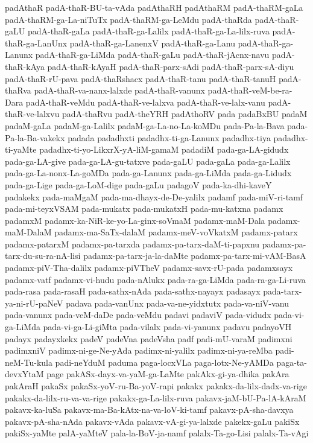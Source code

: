 {padAthaR
padA-thaR-BU-ta-vAda
padAthaRH
padAthaRM
padA-thaRM-gaLa
padA-thaRM-ga-La-niTuTx
padA-thaRM-ga-LeMdu
padA-thaRda
padA-thaR-gaLU
padA-thaR-gaLa
padA-thaR-ga-Lalilx
padA-thaR-ga-La-lilx-ruva
padA-thaR-ga-LanUnx
padA-thaR-ga-LanenxV
padA-thaR-ga-Lanu
padA-thaR-ga-Lanunx
padA-thaR-ga-LiMda
padA-thaR-gaLu
padA-thaR-jAcnx-navu
padA-thaR-kAya
padA-thaR-kAyaH
padA-thaR-parx-sAdi
padA-thaR-parx-sA-diyu
padA-thaR-rU-pava
padA-thaRshacx
padA-thaR-tanu
padA-thaR-tanuH
padA-thaRva
padA-thaR-va-nanx-lalxde
padA-thaR-vanunx
padA-thaR-veM-be-ra-Dara
padA-thaR-veMdu
padA-thaR-ve-lalxva
padA-thaR-ve-lalx-vanu
padA-thaR-ve-lalxvu
padA-thaRvu
padA-theYRH
padAthoRV
pada
padaBxBU
padaM
padaM-gaLa
padaM-ga-Lalilx
padaM-ga-La-no-La-koMDu
pada-Pa-la-Bava
pada-Pa-la-Ba-vakekx
padada
padadhxti
padadhx-ti-ga-Lanunx
padadhx-tiya
padadhx-ti-yaMte
padadhx-ti-yo-LikxrX-yA-liM-gamaM
padadiM
pada-ga-LA-gidudx
pada-ga-LA-give
pada-ga-LA-gu-tatxve
pada-gaLU
pada-gaLa
pada-ga-Lalilx
pada-ga-La-nonx-La-goMDa
pada-ga-Lanunx
pada-ga-LiMda
pada-ga-Lidudx
pada-ga-Lige
pada-ga-LoM-dige
pada-gaLu
padagoV
pada-ka-dhi-kaveY
padakekx
pada-maMgaM
pada-ma-dhayx-de-De-yalilx
padamf
pada-miV-ri-tamf
pada-mi-teyxVSAM
pada-mukatx
pada-mukatxH
pada-mu-katxna
padamx
padamxM
padamx-ka-NiR-ke-yo-La-ginx-soVmaM
padamx-maM-Dala
padamx-maM-DalaM
padamx-ma-SaTx-dalaM
padamx-meV-voVkatxM
padamx-patarx
padamx-patarxM
padamx-pa-tarxda
padamx-pa-tarx-daM-ti-papxnu
padamx-pa-tarx-du-su-ra-nA-lisi
padamx-pa-tarx-ja-la-daMte
padamx-pa-tarx-mi-vAM-BasA
padamx-piV-Tha-dalilx
padamx-piVTheV
padamx-savx-rU-pada
padamxsayx
padamx-vatf
padamx-vi-hudu
pada-nAlukx
pada-ra-ga-LiMda
pada-ra-ga-Li-ruva
pada-rasa
pada-rasaH
pada-sathx-nAda
pada-sathx-nayayx
padasayx
pada-tarx-ya-ni-rU-paNeV
padava
pada-vanUnx
pada-va-ne-yidxtutx
pada-va-niV-vanu
pada-vanunx
pada-veM-daDe
pada-veMdu
padavi
padaviV
pada-vidudx
pada-vi-ga-LiMda
pada-vi-ga-Li-giMta
pada-vilalx
pada-vi-yanunx
padavu
padayoVH
padayx
padayxkekx
padeV
padeVna
padeVsha
padf
padi-mU-varaM
padimxni
padimxniV
padimx-ni-ge-Ne-yAda
padimx-ni-yalilx
padimx-ni-ya-reMba
padi-neM-Tu-kula
padi-neYduM
paduma
paga-locxVLa
paga-lotx-Ne-yAMDa
paga-ta-devxYtaM
page
pakASx-dayx-va-yaM-ga-LaMte
pakAkx-gi-ya-dhika
pakAra
pakAraH
pakaSx
pakaSx-yoV-ru-Ba-yoV-rapi
pakakx
pakakx-da-lilx-dadx-va-rige
pakakx-da-lilx-ru-va-va-rige
pakakx-ga-La-lilx-ruva
pakavx-jaM-bU-Pa-lA-kAraM
pakavx-ka-luSa
pakavx-ma-Ba-kAtx-na-va-loV-ki-tamf
pakavx-pA-sha-davxya
pakavx-pA-sha-nAda
pakavx-vAda
pakavx-vA-gi-ya-lalxde
pakekx-gaLu
pakiSx
pakiSx-yaMte
palA-yaMteV
pala-la-BoV-ja-namf
palalx-Ta-go-Lisi
palalx-Ta-vAgi
}
